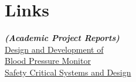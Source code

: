 \documentclass[letterpaper]{deedy-resume} %
\begin{document}
\begin{minipage}[t]{0.33\textwidth} %

\section{Links}
\footnotesize \textit{\textbf{(Academic Project Reports)} } \\
\textbullet{} \href{https://github.com/smihir/BP-Monitoring-Algorithms}{Design and Development of \\ \hphantom{\textbullet{}}Blood Pressure Monitor} \\
\textbullet{} \href{https://github.com/smihir/Safety-Critical-Systems}{Safety Critical Systems and Design} \\

\sectionspace %

\end{minipage} %
\hfill
\end{document}
